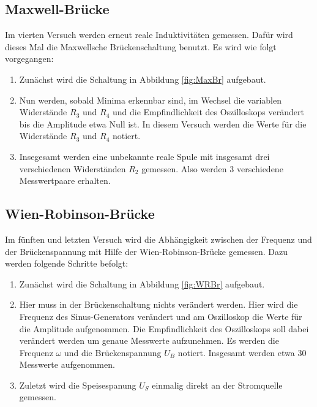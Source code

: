 \subsection{Maxwell-Brücke}
\label{sec:D4}

Im vierten Versuch werden erneut reale Induktivitäten gemessen. Dafür wird
dieses Mal die Maxwellsche Brückenschaltung benutzt.
Es wird wie folgt vorgegangen:

\begin{enumerate}

\item Zunächst wird die Schaltung in Abbildung \ref{fig:MaxBr} aufgebaut.

\item Nun werden, sobald Minima erkennbar sind, im Wechsel die variablen
Widerstände $R_3$ und $R_4$ und die Empfindlichkeit des Oszilloskops verändert
bis die Amplitude etwa Null ist. In diesem Versuch werden die Werte
für die Widerstände $R_3$ und $R_4$ notiert.

\item Insegesamt werden eine unbekannte reale Spule mit
insgesamt drei verschiedenen Widerständen $R_2$ gemessen. Also werden 3
verschiedene Messwertpaare erhalten.

\end{enumerate}

\subsection{Wien-Robinson-Brücke}

Im fünften und letzten Versuch wird die Abhängigkeit zwischen der
Frequenz und der Brückenspannung mit Hilfe der Wien-Robinson-Brücke gemessen.
Dazu werden folgende Schritte befolgt:

\begin{enumerate}

\item Zunächst wird die Schaltung in Abbildung \ref{fig:WRBr} aufgebaut.

\item Hier muss in der Brückenschaltung nichts verändert werden. Hier wird
die Frequenz des Sinus-Generators verändert und am Oszilloskop
die Werte für die Amplitude aufgenommen. Die Empfindlichkeit
des Oszilloskops soll dabei verändert werden um genaue Messwerte aufzunehmen.
Es werden die Frequenz $\omega$ und die Brückenspannung $U_B$ notiert.
Insgesamt werden etwa 30 Messwerte aufgenommen.

\item Zuletzt wird die Speisespanung $U_S$ einmalig direkt an der
Stromquelle gemessen.

\end{enumerate}
